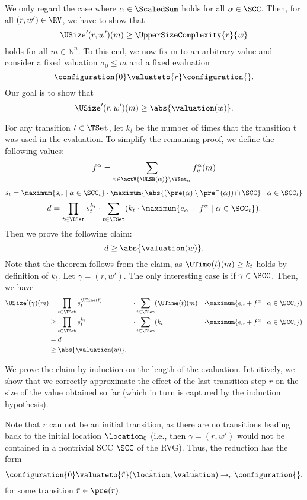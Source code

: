 We only regard the case where $\alpha \in \ScaledSum$ holds for all $\alpha \in \SCC$.
Then, for all $(r, w') \in \RV$, we have to show that
\[ \USize'(r, w')(m) \geq \UpperSizeComplexity{r}{w} \]
holds for all $m \in \mathbb{N}^n$.
To this end, we now fix m to an arbitrary value and consider a fixed valuation $\sigma_0 \leq m$ and a fixed evaluation
\[ \configuration{0} \valuateto{r} \configuration{}. \]
Our goal is to show that
\[ \USize'(r, w')(m) \geq \abs{\valuation(w)}. \]

For any transition $t \in \TSet$, let $k_t$ be the number of times that the transition t was used in the evaluation.
To simplify the remaining proof, we define the following values:
\[ f^\alpha = \sum_{v \in \actV{\ULSB(\alpha)} \setminus \VSet_\alpha} f^\alpha_v(m) \]
\[ s_t = \maximum{s_{\alpha} \mid \alpha \in \SCC_t} \cdot \maximum{\abs{(\pre(\alpha) \setminus \pre^-(\alpha)) \cap \SCC} \mid \alpha \in \SCC_t} \]
\[ d = \prod_{t \in \TSet} s^{k_t}_t \cdot \sum_{t \in \TSet} (k_t \cdot \maximum{e_\alpha + f^\alpha \mid \alpha \in \SCC_t}). \]
Then we prove the following claim:
\[ d \geq \abs{\valuation(w)}. \]
Note that the theorem follows from the claim, as $\UTime(t)(m) \geq k_t$ holds by definition of $k_t$.
Let $\gamma = (r, w')$.
The only interesting case is if $\gamma \in \SCC$.
Then, we have
\begin{align*}
  \USize'(\gamma)(m) &= \prod_{t \in \TSet} s_t^{\UTime(t)} & \cdot \sum_{t \in \TSet} (& \UTime(t)(m) & \cdot \maximum{ e_\alpha + f^\alpha \mid \alpha \in \SCC_t }) \\
  & \geq \prod_{t \in \TSet} s_t^{k_t} & \cdot \sum_{t \in \TSet} (& k_t & \cdot \maximum{ e_\alpha + f^\alpha \mid \alpha \in \SCC_t }) \\
  &= d \\
  & \geq \abs{\valuation(w)}.
\end{align*}

We prove the claim by induction on the length of the evaluation.
Intuitively, we show that we correctly approximate the effect of the last transition step $r$ on the size of the value obtained so far (which in turn is captured by the induction hypothesis).

Note that $r$ can not be an initial transition, as there are no transitions leading back to the initial location $\location_0$
(i.e., then $\gamma = (r, w')$ would not be contained in a nontrivial SCC $\SCC$ of the RVG).
Thus, the reduction has the form
\[ \configuration{0} \valuateto{\tilde{r}} (\tilde{\location}, \tilde{\valuation}) \rightarrow_r \configuration{}. \]
for some transition $\tilde{r} \in \pre(r)$.

